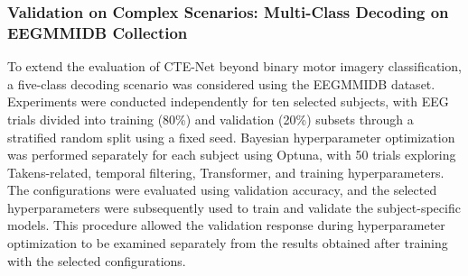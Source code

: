 \subsubsection{Validation on Complex Scenarios: Multi-Class Decoding on EEGMMIDB Collection}
To extend the evaluation of CTE-Net beyond binary motor imagery classification, a five-class decoding scenario was considered using the EEGMMIDB dataset. Experiments were conducted independently for ten selected subjects, with EEG trials divided into training (80\%) and validation (20\%) subsets through a stratified random split using a fixed seed. Bayesian hyperparameter optimization was performed separately for each subject using Optuna, with 50 trials exploring Takens-related, temporal filtering, Transformer, and training hyperparameters. The configurations were evaluated using validation accuracy, and the selected hyperparameters were subsequently used to train and validate the subject-specific models. This procedure allowed the validation response during hyperparameter optimization to be examined separately from the results obtained after training with the selected configurations.
